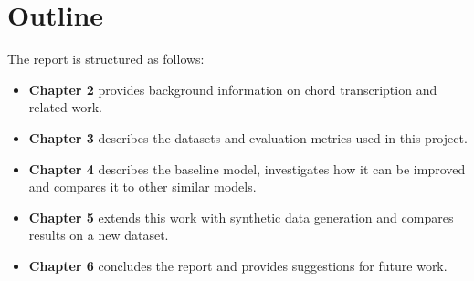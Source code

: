 \section{Outline}

The report is structured as follows:

\begin{itemize}
    \item \textbf{Chapter 2} provides background information on chord transcription and related work.
    \item \textbf{Chapter 3} describes the datasets and evaluation metrics used in this project.
    \item \textbf{Chapter 4} describes the baseline model, investigates how it can be improved and compares it to other similar models.
    \item \textbf{Chapter 5} extends this work with synthetic data generation and compares results on a new dataset.
    \item \textbf{Chapter 6} concludes the report and provides suggestions for future work.
\end{itemize}